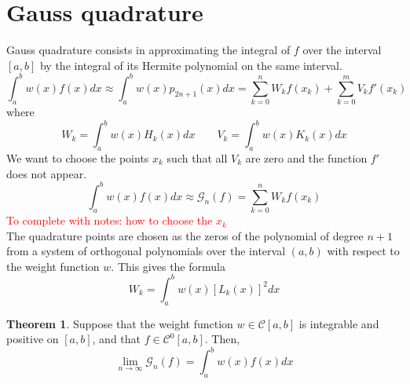 \documentclass[12pt, openany]{report}
\theoremstyle{definition}
\newtheorem{thm}{Theorem}[chapter]
\begin{document}
\section{Gauss quadrature}
Gauss quadrature consists in approximating the integral of $f$ over the interval $[a,b]$ by the integral of its Hermite polynomial on the same interval. 
\begin{equation}
    \int_a^b w(x)f(x)dx \approx \int_a^b w(x)p_{2n+1}(x)dx  = \sum_{k=0}^n W_kf(x_k)+\sum_{k=0}^m V_k f'(x_k)
\end{equation}
where 
\begin{equation}
    W_k = \int_a^bw(x)H_k(x)dx \qquad V_k = \int_a^bw(x)K_k(x)dx
\end{equation}
We want to choose the points $x_k$ such that all $V_k$ are zero and the function $f'$ does not appear. \\
\begin{equation}
    \int_a^b w(x)f(x)dx \approx\mathcal{G}_n(f)= \sum_{k=0}^n W_kf(x_k)
\end{equation}
\textcolor{red}{To complete with notes: how to choose the $x_k$}\\
The quadrature points are chosen as the zeros of the polynomial of degree $n+1$ from a system of orthogonal polynomials over the interval $(a,b)$ with respect to the weight function $w$.
This gives the formula 
\begin{equation}
    W_k = \int_a^b w(x)[L_k(x)]^2dx 
\end{equation}
\begin{thm}
    Suppose that the weight function $w\in \mathcal{C}[a,b]$ is integrable and positive on $[a,b]$, and that $f\in \mathcal{C}^0[a,b]$. Then,
    \begin{equation}
        \lim_{n\rightarrow \infty}\mathcal{G}_n(f) = \int_a^b w(x)f(x)dx
    \end{equation}
\end{thm}
\end{document}
